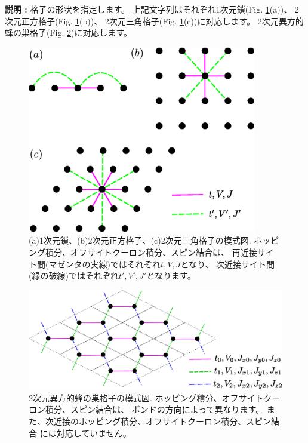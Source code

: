 \begin{itemize}
{\bf 説明 :} 格子の形状を指定します。
上記文字列はそれぞれ1次元鎖(Fig. \ref{fig_chap04_1_lattice}(a))、
2次元正方格子(Fig. \ref{fig_chap04_1_lattice}(b))、
2次元三角格子(Fig. \ref{fig_chap04_1_lattice}(c))に対応します。
2次元異方的蜂の巣格子(Fig. \ref{fig_chap04_1_honeycomb})に対応します。

\begin{figure}[!htbp]
  \begin{center}
    \includegraphics[width=10cm]{../figs/chap04_1_lattice.eps}
    \caption{(a)1次元鎖、(b)2次元正方格子、(c)2次元三角格子の模式図. 
      ホッピング積分、オフサイトクーロン積分、スピン結合は、
      再近接サイト間(マゼンタの実線)ではそれぞれ$t,V,J$となり、
      次近接サイト間(緑の破線)ではそれぞれ$t',V',J'$となります。}
    \label{fig_chap04_1_lattice}
  \end{center}
\end{figure}

\begin{figure}[!htbp]
  \begin{center}
    \includegraphics[width=15cm]{../figs/chap04_1_honeycomb.eps}
    \caption{2次元異方的蜂の巣格子の模式図. 
      ホッピング積分、オフサイトクーロン積分、スピン結合は、
      ボンドの方向によって異なります。
      また、次近接のホッピング積分、オフサイトクーロン積分、スピン結合
      には対応していません。
    }
    \label{fig_chap04_1_honeycomb}
  \end{center}
\end{figure}

\end{itemize}

